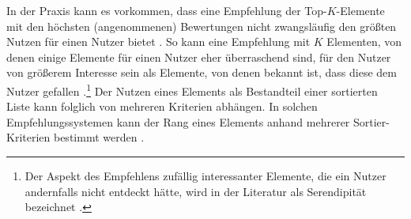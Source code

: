 In der Praxis kann es vorkommen, dass eine Empfehlung der Top-$K$-Elemente mit den höchsten (angenommenen) Bewertungen nicht zwangsläufig den größten Nutzen für einen Nutzer bietet \cite[S. 896ff.]{adomavicius:article}.
So kann eine Empfehlung mit $K$ Elementen, von denen einige Elemente für einen Nutzer eher überraschend sind, für den Nutzer von größerem Interesse sein als Elemente, von denen bekannt ist, dass diese dem Nutzer gefallen \cite[S. 43]{herlocker:article}.\footnote{Der Aspekt des Empfehlens zufällig interessanter Elemente, die ein Nutzer andernfalls nicht entdeckt hätte, wird in der Literatur als Serendipität bezeichnet \cite[S. 43]{herlocker:article}\cite[S. 3]{recommenderSystems:2016}\cite[S. 1099]{mcnee:inproceedings}.}
Der Nutzen eines Elements als Bestandteil einer sortierten Liste kann folglich von mehreren Kriterien abhängen.
In solchen Empfehlungssystemen kann der Rang eines Elements anhand mehrerer Sortier-Kriterien bestimmt werden \cite[S. 405f.]{unternährer:article}.

